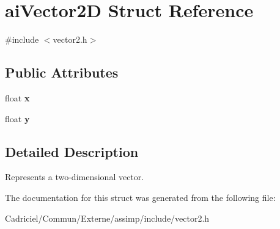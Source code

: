 \hypertarget{structai_vector2_d}{}\section{ai\+Vector2D Struct Reference}
\label{structai_vector2_d}


{\ttfamily \#include $<$vector2.\+h$>$}

\subsection*{Public Attributes}
\begin{DoxyCompactItemize}
\item 
float {\bfseries x}\hypertarget{structai_vector2_d_a968e4db235e054f58b4c320576d82740}{}\label{structai_vector2_d_a968e4db235e054f58b4c320576d82740}

\item 
float {\bfseries y}\hypertarget{structai_vector2_d_a7bb1686f941459496627a3b8ce68e73f}{}\label{structai_vector2_d_a7bb1686f941459496627a3b8ce68e73f}

\end{DoxyCompactItemize}


\subsection{Detailed Description}
Represents a two-\/dimensional vector. 

The documentation for this struct was generated from the following file\+:\begin{DoxyCompactItemize}
\item 
Cadriciel/\+Commun/\+Externe/assimp/include/vector2.\+h\end{DoxyCompactItemize}
